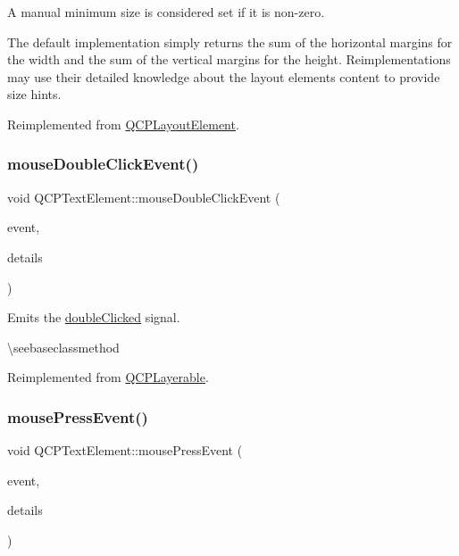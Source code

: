 A manual minimum size is considered set if it is non-\/zero.

The default implementation simply returns the sum of the horizontal margins for the width and the sum of the vertical margins for the height. Reimplementations may use their detailed knowledge about the layout element\textquotesingle{}s content to provide size hints. 

Reimplemented from \mbox{\hyperlink{class_q_c_p_layout_element_a46789036c4fcb190fa374f91321d7c09}{Q\+C\+P\+Layout\+Element}}.

\mbox{\label{class_q_c_p_text_element_a2272ff775ab385f612e9fd39773de7c0}} 
\subsubsection{\texorpdfstring{mouseDoubleClickEvent()}{mouseDoubleClickEvent()}}
{\footnotesize\ttfamily void Q\+C\+P\+Text\+Element\+::mouse\+Double\+Click\+Event (\begin{DoxyParamCaption}\item[{Q\+Mouse\+Event $\ast$}]{event,  }\item[{const Q\+Variant \&}]{details }\end{DoxyParamCaption})\hspace{0.3cm}{\ttfamily [virtual]}}

Emits the \mbox{\hyperlink{class_q_c_p_text_element_a9c6fd27ae8a7c3a02df7a6bbd3509e40}{double\+Clicked}} signal.

\textbackslash{}seebaseclassmethod 

Reimplemented from \mbox{\hyperlink{class_q_c_p_layerable_a4171e2e823aca242dd0279f00ed2de81}{Q\+C\+P\+Layerable}}.

\mbox{\label{class_q_c_p_text_element_ad7b2c98355e3d2f912574b74fcee0574}} 
\subsubsection{\texorpdfstring{mousePressEvent()}{mousePressEvent()}}
{\footnotesize\ttfamily void Q\+C\+P\+Text\+Element\+::mouse\+Press\+Event (\begin{DoxyParamCaption}\item[{Q\+Mouse\+Event $\ast$}]{event,  }\item[{const Q\+Variant \&}]{details }\end{DoxyParamCaption})\hspace{0.3cm}{\ttfamily [virtual]}}

